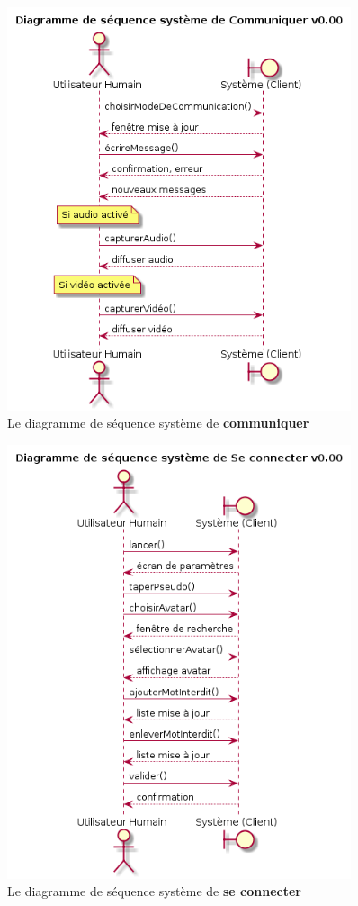 \documentclass[11pt,dvipsnames,svgnames]{report}
\begin{document}
\begin{figure}[H]
\caption{Le diagramme de séquence système de \textbf{communiquer}}
\centerline{\includegraphics[width=0.9\textwidth]{diagrammes/dss-communiquer.png}}
\end{figure}

\begin{figure}[H]
\caption{Le diagramme de séquence système de \textbf{se connecter}}
\centerline{\includegraphics[width=0.9\textwidth]{diagrammes/dss-connexion.png}}
\end{figure}
\end{document}
